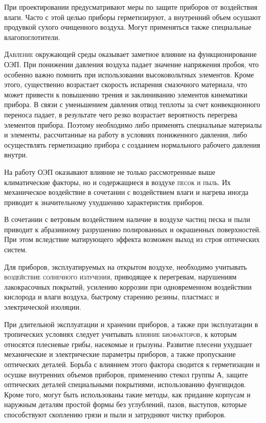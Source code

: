 При проектировании предусматривают меры по защите приборов от воздействия влаги. Часто с этой целью приборы герметизируют, а внутренний объем осушают продувкой сухого очищенного воздуха. Могут применяться также специальные влагопоглотители.

\textsc{Давление} окружающей среды оказывает заметное влияние на функционирование ОЭП. При понижении давления воздуха падает значение напряжения пробоя, что особенно важно помнить при использовании высоковольтных элементов. Кроме этого, существенно возрастает скорость испарения смазочного материала, что может привести к повышению трения и заклиниванию элементов кинематики прибора. В связи с уменьшением давления отвод теплоты за счет конвекционного переноса падает, в результате чего резко возрастает вероятность перегрева элементов прибора. Поэтому необходимо либо применять специальные материалы и элементы, рассчитанные на работу в условиях пониженного давления, либо осуществлять герметизацию прибора с созданием нормального рабочего давления внутри.

На работу ОЭП оказывают влияние не только рассмотренные выше климатические факторы, но и содержащиеся в воздухе \textsc{песок и пыль}. Их механическое воздействие в сочетании с воздействием влаги и нагрева иногда приводит к значительному ухудшению характеристик приборов.

В сочетании с ветровым воздействием наличие в воздухе частиц песка и пыли приводит к абразивному разрушению полированных и окрашенных поверхностей. При этом вследствие матирующего эффекта возможен выход из строя оптических систем.

Для приборов, эксплуатируемых на открытом воздухе, необходимо учитывать \textsc{воздействие солнечного излучения}, приводящее к перегревам, нарушениям лакокрасочных покрытий, усилению коррозии при одновременном воздействии кислорода и влаги воздуха, быстрому старению резины, пластмасс и электрической изоляции.

При длительной эксплуатации и хранении приборов, а также при эксплуатации в тропических условиях следует учитывать \textsc{влияние биофакторов}, к которым относятся плесневые грибы, насекомые и грызуны. Развитие плесени ухудшает механические и электрические параметры приборов, а также пропускание оптических деталей. Борьба с влиянием этого фактора сводится к герметизации и осушке внутренних объемов приборов, применению стекол группы А, защите оптических деталей специальными покрытиями, использованию фунгицидов. Кроме того, могут быть использованы такие методы, как придание корпусам и наружным деталям простой формы без углублений, пазов, выступов, которые способствуют скоплению грязи и пыли и затрудняют чистку приборов.

